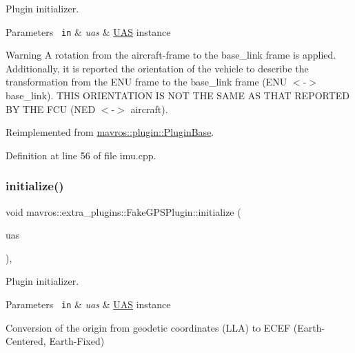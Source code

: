 Plugin initializer. 


\begin{DoxyParams}[1]{Parameters}
\mbox{\texttt{ in}}  & {\em uas} & {\ttfamily \mbox{\hyperlink{classmavros_1_1UAS}{U\+AS}}} instance \\
\hline
\end{DoxyParams}
\begin{DoxyWarning}{Warning}
A rotation from the aircraft-\/frame to the base\+\_\+link frame is applied. Additionally, it is reported the orientation of the vehicle to describe the transformation from the E\+NU frame to the base\+\_\+link frame (E\+NU $<$-\/$>$ base\+\_\+link). T\+H\+IS O\+R\+I\+E\+N\+T\+A\+T\+I\+ON IS N\+OT T\+HE S\+A\+ME AS T\+H\+AT R\+E\+P\+O\+R\+T\+ED BY T\+HE F\+CU (N\+ED $<$-\/$>$ aircraft).
\end{DoxyWarning}


Reimplemented from \mbox{\hyperlink{group__plugin_gad5313a41da4d26acbbabf008cdc21e82}{mavros\+::plugin\+::\+Plugin\+Base}}.



Definition at line 56 of file imu.\+cpp.

\mbox{\label{group__plugin_gafcd498b4d7ddb485258eaade7b3aea3f}} 
\subsubsection{\texorpdfstring{initialize()}{initialize()}\hspace{0.1cm}{\footnotesize\ttfamily [33/41]}}
{\footnotesize\ttfamily void mavros\+::extra\+\_\+plugins\+::\+Fake\+G\+P\+S\+Plugin\+::initialize (\begin{DoxyParamCaption}\item[{\mbox{\hyperlink{classmavros_1_1UAS}{U\+AS}} \&}]{uas }\end{DoxyParamCaption})\hspace{0.3cm}{\ttfamily [inline]}, {\ttfamily [virtual]}}



Plugin initializer. 


\begin{DoxyParams}[1]{Parameters}
\mbox{\texttt{ in}}  & {\em uas} & {\ttfamily \mbox{\hyperlink{classmavros_1_1UAS}{U\+AS}}} instance \\
\hline
\end{DoxyParams}
Conversion of the origin from geodetic coordinates (L\+LA) to E\+C\+EF (Earth-\/\+Centered, Earth-\/\+Fixed)

